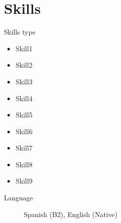\section{Skills}
\begin{description}
    \item[Skills type] %
\end{description}
    
    \begin{multicols}{3} %
    \begin{itemize}
        \item Skill1 %
        \item Skill2 %
        \item Skill3 %
        \item Skill4 %
        \item Skill5 %
        \item Skill6 %
        \item Skill7 %
        \item Skill8 %
        \item Skill9 %
    \end{itemize}
    \end{multicols}
    \begin{description}
    \item[Language] Spanish (B2), English (Native) %
\end{description}
